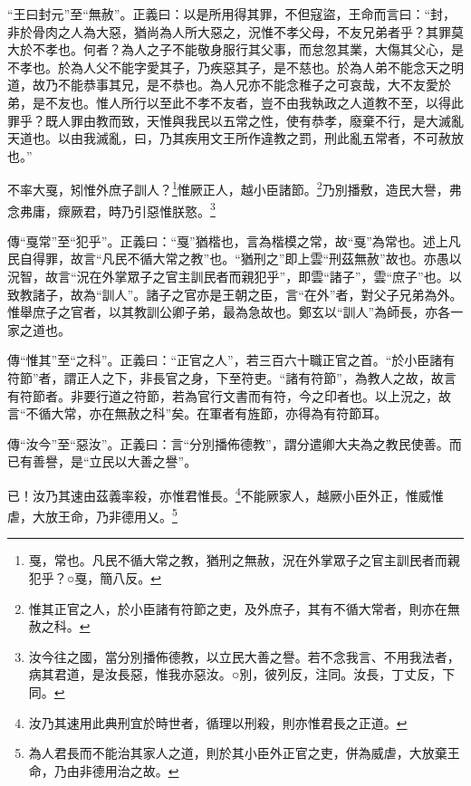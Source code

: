 {\noindent\shu{}\fzkt “王曰封元”至“無赦”。正義曰：以是所用得其罪，不但寇盜，王命而言曰：“封，非於骨肉之人為大惡，猶尚為人所大惡之，況惟不孝父母，不友兄弟者乎？其罪莫大於不孝也。何者？為人之子不能敬身服行其父事，而怠忽其業，大傷其父心，是不孝也。於為人父不能字愛其子，乃疾惡其子，是不慈也。於為人弟不能念天之明道，故乃不能恭事其兄，是不恭也。為人兄亦不能念稚子之可哀哉，大不友愛於弟，是不友也。惟人所行以至此不孝不友者，豈不由我執政之人道教不至，以得此罪乎？既人罪由教而致，天惟與我民以五常之性，使有恭孝，廢棄不行，是大滅亂天道也。以由我滅亂，曰，乃其疾用文王所作違教之罰，刑此亂五常者，不可赦放也。” \par}

不率大戛，矧惟外庶子訓人？\footnote{戛，常也。凡民不循大常之教，猶刑之無赦，況在外掌眾子之官主訓民者而親犯乎？○戛，簡八反。}惟厥正人，越小臣諸節。\footnote{惟其正官之人，於小臣諸有符節之吏，及外庶子，其有不循大常者，則亦在無赦之科。}乃別播敷，造民大譽，弗念弗庸，瘝厥君，時乃引惡惟朕憝。\footnote{汝今往之國，當分別播佈德教，以立民大善之譽。若不念我言、不用我法者，病其君道，是汝長惡，惟我亦惡汝。○別，彼列反，注同。汝長，丁丈反，下同。}


{\noindent\zhuan{}\fzbyks 傳“戛常”至“犯乎”。正義曰：“戛”猶楷也，言為楷模之常，故“戛”為常也。述上凡民自得罪，故言“凡民不循大常之教”也。“猶刑之”即上雲“刑茲無赦”故也。亦愚以況智，故言“況在外掌眾子之官主訓民者而親犯乎”，即雲“諸子”，雲“庶子”也。以致教諸子，故為“訓人”。諸子之官亦是王朝之臣，言“在外”者，對父子兄弟為外。惟舉庶子之官者，以其教訓公卿子弟，最為急故也。鄭玄以“訓人”為師長，亦各一家之道也。 \par}

{\noindent\zhuan{}\fzbyks 傳“惟其”至“之科”。正義曰：“正官之人”，若三百六十職正官之首。“於小臣諸有符節”者，謂正人之下，非長官之身，下至符吏。“諸有符節”，為教人之故，故言有符節者。非要行道之符節，若為官行文書而有符，今之印者也。以上況之，故言“不循大常，亦在無赦之科”矣。在軍者有旌節，亦得為有符節耳。 \par}

{\noindent\zhuan{}\fzbyks 傳“汝今”至“惡汝”。正義曰：言“分別播佈德教”，謂分遣卿大夫為之教民使善。而已有善譽，是“立民以大善之譽”。 \par}

已！汝乃其速由茲義率殺，亦惟君惟長。\footnote{汝乃其速用此典刑宜於時世者，循理以刑殺，則亦惟君長之正道。}不能厥家人，越厥小臣外正，惟威惟虐，大放王命，乃非德用乂。\footnote{為人君長而不能治其家人之道，則於其小臣外正官之吏，併為威虐，大放棄王命，乃由非德用治之故。}


